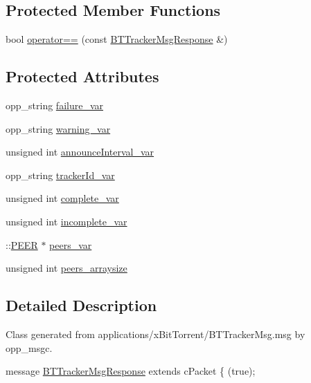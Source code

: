 \subsection*{Protected Member Functions}
\begin{DoxyCompactItemize}
\item 
bool \hyperlink{classBTTrackerMsgResponse_a33217d7065a2c648251407e0b61cd1a7}{operator==} (const \hyperlink{classBTTrackerMsgResponse}{B\+T\+Tracker\+Msg\+Response} \&)
\end{DoxyCompactItemize}
\subsection*{Protected Attributes}
\begin{DoxyCompactItemize}
\item 
opp\+\_\+string \hyperlink{classBTTrackerMsgResponse_a0dc56a9e8c562d00690f9f72ea59b1fd}{failure\+\_\+var}
\item 
opp\+\_\+string \hyperlink{classBTTrackerMsgResponse_a2d586220ffb2eb63253d19dbbce252f8}{warning\+\_\+var}
\item 
unsigned int \hyperlink{classBTTrackerMsgResponse_a0e2fa84a47aa20e0f4a17de270b819c0}{announce\+Interval\+\_\+var}
\item 
opp\+\_\+string \hyperlink{classBTTrackerMsgResponse_a95d4eed6b7304f41ac4d967020ca5024}{tracker\+Id\+\_\+var}
\item 
unsigned int \hyperlink{classBTTrackerMsgResponse_a6631a0aa7c951abebf37fe5aa4ae4322}{complete\+\_\+var}
\item 
unsigned int \hyperlink{classBTTrackerMsgResponse_aeec84d5b5adc2526912e05764b71fd3e}{incomplete\+\_\+var}
\item 
\+::\hyperlink{structPEER}{P\+E\+E\+R} $\ast$ \hyperlink{classBTTrackerMsgResponse_a1aa01eb6c2c6a28498173d1d0f578b72}{peers\+\_\+var}
\item 
unsigned int \hyperlink{classBTTrackerMsgResponse_a4bf054f44b6387c2d6d71d4009d96f9a}{peers\+\_\+arraysize}
\end{DoxyCompactItemize}


\subsection{Detailed Description}
Class generated from {\ttfamily applications/x\+Bit\+Torrent/\+B\+T\+Tracker\+Msg.\+msg} by opp\+\_\+msgc. 
\begin{DoxyPre}
message \hyperlink{classBTTrackerMsgResponse}{BTTrackerMsgResponse} extends cPacket
\{
    (true);\end{DoxyPre}



